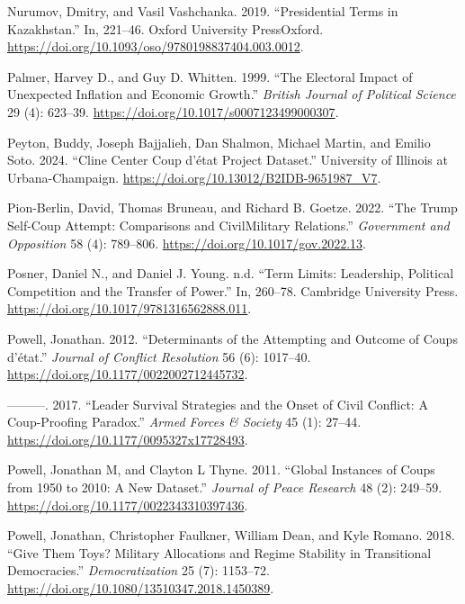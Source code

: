 \documentclass[
  12pt,
]{report}
\newlength{\cslhangindent}
\newenvironment{CSLReferences}[2] %
 {\begin{list}{}{%
  \setlength{\itemindent}{0pt}
  \setlength{\leftmargin}{0pt}
  \setlength{\parsep}{0pt}
  \ifodd #1
   \setlength{\leftmargin}{\cslhangindent}
   \setlength{\itemindent}{-1\cslhangindent}
  \fi
  \setlength{\itemsep}{#2\baselineskip}}}
 {\end{list}}
\begin{document}
\begin{CSLReferences}{1}{0}
Nurumov, Dmitry, and Vasil Vashchanka. 2019. {``Presidential Terms in
Kazakhstan.''} In, 221--46. Oxford University PressOxford.
\url{https://doi.org/10.1093/oso/9780198837404.003.0012}.

Palmer, Harvey D., and Guy D. Whitten. 1999. {``The Electoral Impact of
Unexpected Inflation and Economic Growth.''} \emph{British Journal of
Political Science} 29 (4): 623--39.
\url{https://doi.org/10.1017/s0007123499000307}.

Peyton, Buddy, Joseph Bajjalieh, Dan Shalmon, Michael Martin, and Emilio
Soto. 2024. {``Cline Center Coup d{'}état Project Dataset.''} University
of Illinois at Urbana-Champaign.
\url{https://doi.org/10.13012/B2IDB-9651987_V7}.

Pion-Berlin, David, Thomas Bruneau, and Richard B. Goetze. 2022. {``The
Trump Self-Coup Attempt: Comparisons and Civil{\textendash}Military
Relations.''} \emph{Government and Opposition} 58 (4): 789--806.
\url{https://doi.org/10.1017/gov.2022.13}.

Posner, Daniel N., and Daniel J. Young. n.d. {``Term Limits: Leadership,
Political Competition and the Transfer of Power.''} In, 260--78.
Cambridge University Press.
\url{https://doi.org/10.1017/9781316562888.011}.

Powell, Jonathan. 2012. {``Determinants of the Attempting and Outcome of
Coups d{'}état.''} \emph{Journal of Conflict Resolution} 56 (6):
1017--40. \url{https://doi.org/10.1177/0022002712445732}.

---------. 2017. {``Leader Survival Strategies and the Onset of Civil
Conflict: A Coup-Proofing Paradox.''} \emph{Armed Forces \& Society} 45
(1): 27--44. \url{https://doi.org/10.1177/0095327x17728493}.

Powell, Jonathan M, and Clayton L Thyne. 2011. {``Global Instances of
Coups from 1950 to 2010: A New Dataset.''} \emph{Journal of Peace
Research} 48 (2): 249--59.
\url{https://doi.org/10.1177/0022343310397436}.

Powell, Jonathan, Christopher Faulkner, William Dean, and Kyle Romano.
2018. {``Give Them Toys? Military Allocations and Regime Stability in
Transitional Democracies.''} \emph{Democratization} 25 (7): 1153--72.
\url{https://doi.org/10.1080/13510347.2018.1450389}.


\end{CSLReferences}
\end{document}
